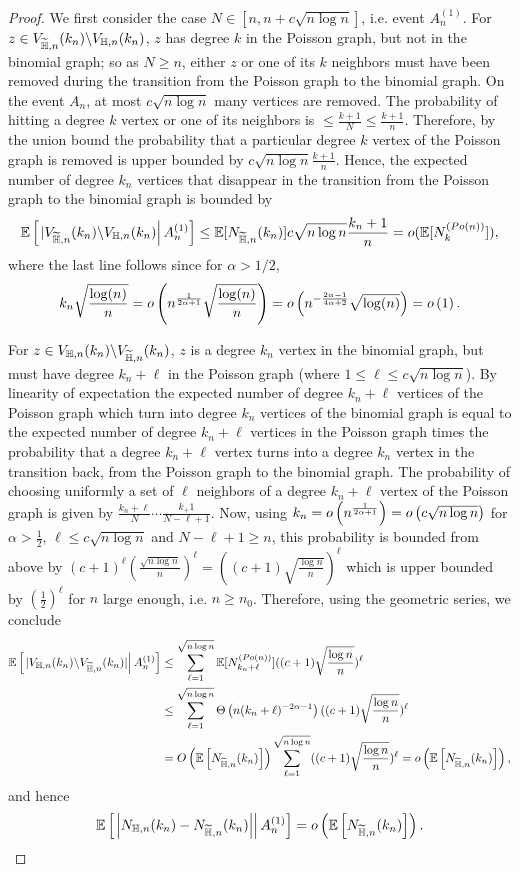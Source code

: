\begin{proof}
We first consider the case $N \in [n,n+c\sqrt{n\log n}]$, i.e. event $A_n^{(1)}$. For $z \in V_{\widetilde{\mathbb{H}},n}(k_n) \backslash V_{\mathbb{H},n}(k_n)$, $z$ has degree $k$ in the Poisson graph, but not in the binomial graph; so as $N \geq n$, either $z$ or one of its $k$ neighbors must have been removed during the transition from the Poisson graph to the binomial graph. On the event $A_n$, at most $c\sqrt{n\log n}$ many vertices are removed. The probability of hitting a degree $k$ vertex or one of its neighbors is $\leq \frac{k+1}{N} \leq \frac{k+1}{n}$. Therefore, by the union bound the probability that a particular degree $k$ vertex of the Poisson graph is removed is upper bounded by $c\sqrt{n\log n}\frac{k+1}{n}$. Hence, the expected number of degree $k_n$ vertices that disappear in the transition from the Poisson graph to the binomial graph is bounded by 
\[
	\mathbb{E}\left[\left.|V_{\widetilde{\mathbb{H}},n}(k_n) \backslash V_{\mathbb{H},n}(k_n)\right|A_n^{(1)}\right]\leq \mathbb{E}[N_{\widetilde{\mathbb{H}},n}(k_n)] c\sqrt{n \log n}\frac{k_n+1}{n}  = o(\mathbb{E}[N_k^{(Po(n))}]),
\] 
where the last line follows since for $\alpha > 1/2$,
\[
	k_n \sqrt{\frac{\log(n)}{n}} = o\left(n^{\frac{1}{2\alpha + 1}}\sqrt{\frac{\log(n)}{n}}\right) 
	= o\left(n^{-\frac{2\alpha - 1}{4\alpha + 2}} \sqrt{\log(n)}\right) = o\left(1\right).
\]

For $z \in V_{\mathbb{H},n}(k_n) \backslash V_{\widetilde{\mathbb{H}},n}(k_n)$, $z$ is a degree $k_n$ vertex in the binomial graph, but 
must have degree $k_n+\ell$ in the Poisson graph (where $1 \leq \ell \leq c\sqrt{n\log n}$). By linearity of expectation the expected number of degree $k_n+\ell$ vertices of the Poisson graph which turn into degree $k_n$ vertices of the binomial graph is equal to the expected number of degree $k_n+\ell$ vertices in the Poisson graph times the probability that a degree $k_n+\ell$ vertex turns into a degree $k_n$ vertex in the transition back, from the Poisson graph to the binomial graph. The probability of choosing uniformly a set of $\ell$ neighbors of a degree $k_n+\ell$ vertex of the Poisson graph is given by $\frac{k_n+\ell}{N}\cdots \frac{k_+1}{N-\ell + 1}$. Now, using $k_n = o\left(n^{\frac{1}{2\alpha+1}}\right) = o\left(c\sqrt{n\log n}\right)$ for $\alpha > \frac{1}{2}$, $\ell \leq c\sqrt{n \log n}$ and $N-\ell + 1 \geq n$, this probability is bounded from above by $(c+1)^\ell (\frac{\sqrt{n \log n}}{n})^\ell =((c+1) \sqrt{\frac{\log n}{n}})^\ell$ which is upper bounded by $(\frac{1}{2})^\ell$ for $n$ large enough, i.e. $n \geq n_0$. Therefore, using the geometric series, we conclude
\begin{align*}
\mathbb{E}\left[\left.|V_{\mathbb{H},n}(k_n) \backslash V_{\widetilde{\mathbb{H}},n}(k_n)|\right|A_n^{(1)}\right] 
&\le  \sum_{\ell=1}^{\sqrt{n\log n}} \mathbb{E}[N_{k_n+\ell}^{(Po(n))}] ((c+1)\sqrt{\frac{\log n}{n}})^{\ell}\\
&\le \sum_{\ell=1}^{\sqrt{n\log n}} \Theta\left(n (k_n+\ell)^{-2\alpha-1}\right) ((c+1)\sqrt{\frac{\log n}{n}})^{\ell}\\
&= O\left(\mathbb{E}\left[N_{\widetilde{\mathbb{H}},n}(k_n)\right]\right) \sum_{\ell=1}^{\sqrt{n\log n}} ((c+1)\sqrt{\frac{\log n}{n}})^{\ell}
= o\left(\mathbb{E}\left[N_{\widetilde{\mathbb{H}},n}(k_n)\right]\right),
\end{align*}
and hence
\[
	\mathbb{E}\left[\left.\left|N_{\mathbb{H},n}(k_n)-N_{\widetilde{\mathbb{H}},n}(k_n)\right|\right|A_n^{(1)}\right] = o\left(\mathbb{E}\left[N_{\widetilde{\mathbb{H}},n}(k_n)\right]\right).
\]


\end{proof}
